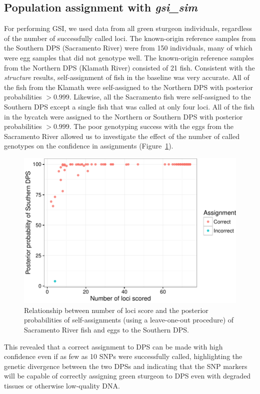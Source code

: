 \documentclass[twocolumn,natbib]{svjour3}       %
\begin{document}
\subsection{Population assignment with {\em gsi\_sim}}
For performing GSI, we used data from all green sturgeon individuals, 
regardless of the number of successfully called loci. 
The known-origin reference samples from the Southern DPS (Sacramento
River) were from 150 individuals, many of which were egg samples that did not
genotype well. The known-origin reference samples from the Northern DPS (Klamath River) 
consisted of 21
fish. Consistent with the {\em structure} results, self-assignment of fish in the
baseline was very accurate. All of the fish from the Klamath were self-assigned
to the Northern DPS with posterior probabilities $> 0.999$. Likewise, all the
Sacramento fish were self-assigned to the Southern DPS except a single fish that
was called at only four loci. All of the fish in the bycatch were assigned to the
Northern or Southern DPS with posterior probabilities $> 0.999$. The poor
genotyping success with the eggs from the Sacramento River allowed us
to investigate the effect of the number of called genotypes on the confidence in
assignments (Figure~\ref{fig:sacto-self-ass}).
\begin{figure}
\includegraphics[width = \linewidth]{self-ass-plot-crop.pdf}
\caption{ Relationship between number of loci score and the posterior probabilities of self-assignments 
(using a leave-one-out procedure) of Sacramento River fish and eggs to
the Southern DPS.  \label{fig:sacto-self-ass}}
\end{figure}
This revealed that a correct assignment to DPS can be made
with high confidence even if as few as 10 SNPs were successfully called,
highlighting the genetic divergence between the two DPSs and indicating that the
SNP markers will be capable of correctly assigning green sturgeon to DPS even with
degraded tissues or otherwise low-quality DNA.
\end{document}
